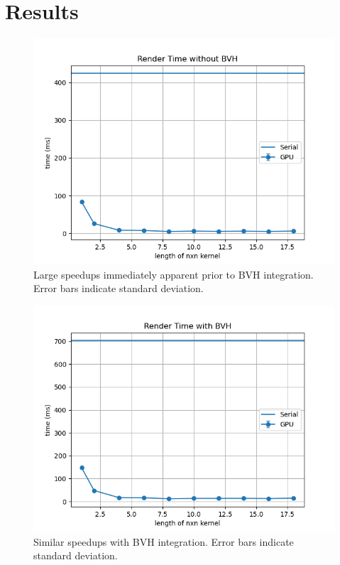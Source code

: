 \documentclass[11pt]{article}
\begin{document}
\section{Results}

\begin{figure}
    \centering
    \includegraphics[scale=.6]{world1b1.png}
    \caption{Large speedups immediately apparent prior to BVH integration. Error bars indicate standard deviation.}
    \label{fig:no_bvh}
\end{figure}

\begin{figure}
    \centering
    \includegraphics[scale=.6]{world8b8.png}
    \caption{Similar speedups with BVH integration. Error bars indicate standard deviation.}
    \label{figure:bvh}
\end{figure}
\end{document}
